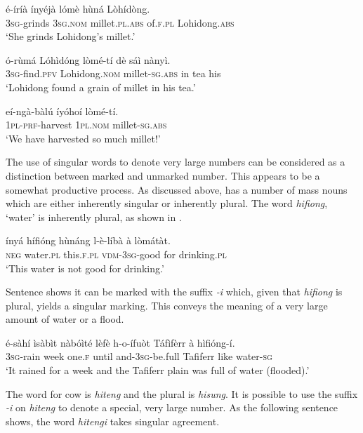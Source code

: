 \documentclass[output=paper]{langsci/langscibook}
\begin{document}
\ea\label{ex:moodie:8}
\gll é-íríà ínyéjà lómè hùná Lòhídòng. \\
3\textsc{sg}-grinds 3\textsc{sg.nom} millet.\textsc{pl.abs} of.\textsc{f.pl} Lohidong.\textsc{abs} \\
\glt ‘She grinds Lohidong’s millet.’
\z

\ea\label{ex:moodie:9}
\gll ó-rùmá Lóhìdóng lòmé-tí dè sáì nànyì.  \\
3\textsc{sg}-find.\textsc{pfv} Lohidong.\textsc{nom} millet-\textsc{sg.abs} in tea his \\
\glt ‘Lohidong found a grain of millet in his tea.’
\z

\ea\label{ex:moodie:10}
\gll eí-ngà-bàlú íyóhoí lòmé-tí. \\
1\textsc{pl-prf}-harvest 1\textsc{pl.nom} millet-\textsc{sg.abs} \\
\glt ‘We have harvested so much millet!’
\z

The use of singular words to denote very large numbers can be considered as a distinction between marked and unmarked number. This appears to be a somewhat productive process. As discussed above,  has a number of mass nouns which are either inherently singular or inherently plural. The word \textit{hifiong}, ‘water’ is inherently plural, as shown in .

\ea\label{ex:moodie:11}
\gll ínyá hífióng hùnáng l-è-líbà à lòmátàt. \\
\textsc{neg} water.\textsc{pl} this.\textsc{f.pl} \textsc{vdm-3sg}-good for drinking.\textsc{pl} \\
\glt ‘This water is not good for drinking.’
\z

Sentence  shows it can be marked with the suffix \textit{-i} which, given that \textit{hifiong} is plural, yields a singular marking. This conveys the meaning of a very large amount of water or a flood.

\ea\label{ex:moodie:12}
\gll é-sàhí ìsàbìt nàbóìté lèfè h-o-ífuòt Táfìfèrr à hìfióng-í. \\
\textsc{3sg}-rain week one.\textsc{f} until and-3\textsc{sg}-be.full Tafiferr like water-\textsc{sg} \\
\glt ‘It rained for a week and the Tafiferr plain was full of water (flooded).’ 
\z

The word for cow is \textit{hiteng} and the plural is \textit{hisung}. It is possible to use the suffix \textit{-i} on \textit{hiteng} to denote a special, very large number. As the following sentence shows, the word \textit{hitengi} takes singular agreement.
\end{document}
